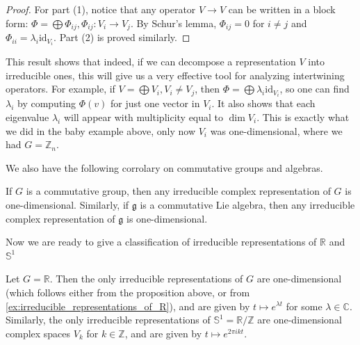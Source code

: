 \documentclass{report}
\begin{document}
\begin{proof}
For part (1), notice that any operator \( V \to V \) can be written in a block form: \( \Phi = \bigoplus \Phi_{ij}, \Phi_{ij} : V_i \to V_j \). By Schur's lemma, \( \Phi_{ij} = 0 \) for \( i \neq j \) and \( \Phi_{ii} = \lambda_i \mathrm{id}_{V_i} \). Part (2) is proved similarly.
\end{proof}

This result shows that indeed, if we can decompose a representation \( V \) into irreducible ones, this will give us a very effective tool for analyzing intertwining operators. For example, if \( V = \bigoplus V_i, V_i \neq V_j \), then \( \Phi = \bigoplus \lambda_i \mathrm{id}_{V_i} \), so one can find \( \lambda_i \) by computing \( \Phi(v) \) for just one vector in \( V_i \). It also shows that each eigenvalue \( \lambda_i \) will appear with multiplicity equal to \( \dim V_i \). This is exactly what we did in the baby example above, only now \( V_i \) was one-dimensional, where we had \( G = \mathbb{Z}_n \).

We also have the following corrolary on commutative groups and algebras.
\begin{proposition}
    If $G$ is a commutative group, then any irreducible complex
representation of $G$ is one-dimensional. Similarly, if $\mathfrak g$ is a commutative Lie algebra, then any irreducible complex representation of $\mathfrak g$ is one-dimensional.
\end{proposition}
Now we are ready to give a classification of irreducible representations of $\mathbb R$ and $\mathbb S^1$
\begin{example}\label{ex:irreducible_representations_of_R}
    Let $G = \mathbb R$.
    Then the only irreducible representations of $G$ are one-dimensional (which follows either from the proposition above, or from \cref{ex:irreducible_representations_of_R}), and are given by $t \mapsto e^{\lambda t} $ for some $\lambda \in \mathbb C$.
    Similarly, the only irreducible representations of $\mathbb S^1 = \mathbb R/ \mathbb Z$ are one-dimensional complex spaces $V_k$ for $k \in \mathbb Z$, and are given by $t \mapsto e^{2\pi i k t}$.
\end{example}
\end{document}
